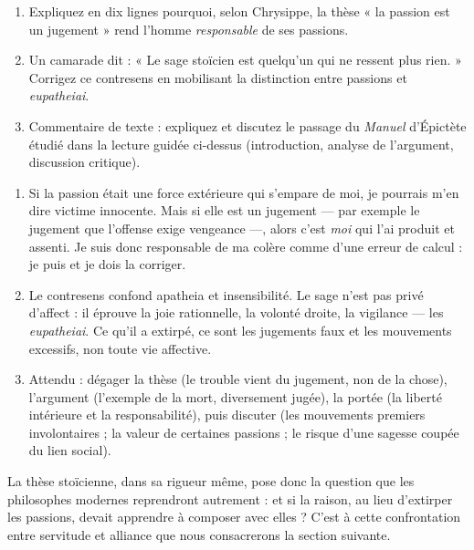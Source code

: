 \documentclass[11pt]{article}
\begin{document}
\begin{exercice}
\begin{enumerate}
\item Expliquez en dix lignes pourquoi, selon Chrysippe, la thèse « la passion est un jugement » rend l'homme \emph{responsable} de ses passions.
\item Un camarade dit : « Le sage stoïcien est quelqu'un qui ne ressent plus rien. » Corrigez ce contresens en mobilisant la distinction entre passions et \emph{eupatheiai}.
\item Commentaire de texte : expliquez et discutez le passage du \emph{Manuel} d'Épictète étudié dans la lecture guidée ci-dessus (introduction, analyse de l'argument, discussion critique).
\end{enumerate}
\end{exercice}

\begin{corrige}
\begin{enumerate}
\item Si la passion était une force extérieure qui s'empare de moi, je pourrais m'en dire victime innocente. Mais si elle est un jugement — par exemple le jugement que l'offense exige vengeance —, alors c'est \emph{moi} qui l'ai produit et assenti. Je suis donc responsable de ma colère comme d'une erreur de calcul : je puis et je dois la corriger.
\item Le contresens confond apatheia et insensibilité. Le sage n'est pas privé d'affect : il éprouve la joie rationnelle, la volonté droite, la vigilance — les \emph{eupatheiai}. Ce qu'il a extirpé, ce sont les jugements faux et les mouvements excessifs, non toute vie affective.
\item Attendu : dégager la thèse (le trouble vient du jugement, non de la chose), l'argument (l'exemple de la mort, diversement jugée), la portée (la liberté intérieure et la responsabilité), puis discuter (les mouvements premiers involontaires ; la valeur de certaines passions ; le risque d'une sagesse coupée du lien social).
\end{enumerate}
\end{corrige}

La thèse stoïcienne, dans sa rigueur même, pose donc la question que les philosophes modernes reprendront autrement : et si la raison, au lieu d'extirper les passions, devait apprendre à composer avec elles ? C'est à cette confrontation entre servitude et alliance que nous consacrerons la section suivante.
\end{document}
